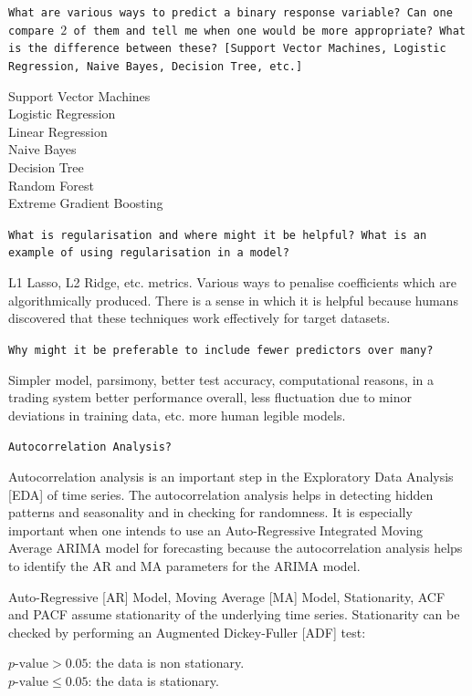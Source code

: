 \texttt{What are various ways to predict a binary response variable? Can one compare $2$ of them and tell me when one would be more appropriate? What is the difference between these? [Support Vector Machines, Logistic Regression, Naive Bayes, Decision Tree, etc.]}

Support Vector Machines \\
Logistic Regression \\
Linear Regression \\
Naive Bayes \\
Decision Tree \\
Random Forest \\
Extreme Gradient Boosting

\texttt{What is regularisation and where might it be helpful? What is an example of using regularisation in a model?}

L1 Lasso, L2 Ridge, etc. metrics. Various ways to penalise coefficients which are algorithmically produced. There is a sense in which it is helpful because humans discovered that these techniques work effectively for target datasets.

\texttt{Why might it be preferable to include fewer predictors over many?}

Simpler model, parsimony, better test accuracy, computational reasons, in a trading system better performance overall, less fluctuation due to minor deviations in training data, etc. more human legible models.

\texttt{Autocorrelation Analysis?}

Autocorrelation analysis is an important step in the Exploratory Data Analysis [EDA] of time series. The autocorrelation analysis helps in detecting hidden patterns and seasonality and in checking for randomness. It is especially important when one intends to use an Auto-Regressive Integrated Moving Average ARIMA model for forecasting because the autocorrelation analysis helps to identify the AR and MA parameters for the ARIMA model.

Auto-Regressive [AR] Model, Moving Average [MA] Model, Stationarity, ACF and PACF assume stationarity of the underlying time series. Stationarity can be checked by performing an Augmented Dickey-Fuller [ADF] test:

$p\text{-value} > 0.05$: the data is non stationary. \\
$p\text{-value} \le 0.05$: the data is stationary.

